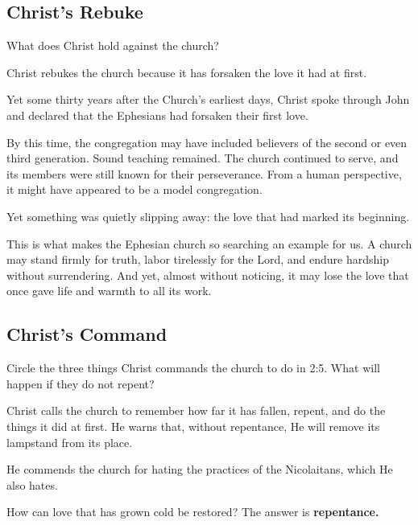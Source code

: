 \subsection{Christ's Rebuke}

\begin{ScriptureBox2}{What does Christ hold against the church?}
\item[2:4] Christ rebukes the church because it has forsaken the love it had at first.
\end{ScriptureBox2}

Yet some thirty years after the Church's earliest days, Christ spoke through John and declared that the Ephesians had forsaken their first love.

By this time, the congregation may have included believers of the second or even third generation. Sound teaching remained. The church continued to serve, and its members were still known for their perseverance. From a human perspective, it might have appeared to be a model congregation.

Yet something was quietly slipping away: the love that had marked its beginning.

This is what makes the Ephesian church so searching an example for us. A church may stand firmly for truth, labor tirelessly for the Lord, and endure hardship without surrendering. And yet, almost without noticing, it may lose the love that once gave life and warmth to all its work.

\subsection{Christ's Command}

\begin{ScriptureBox2}{Circle the three things Christ commands the church to do in 2:5. What will happen if they do not repent?}
\item[2:5] Christ calls the church to remember how far it has fallen, repent, and do the things it did at first. He warns that, without repentance, He will remove its lampstand from its place.

\item[2:6] He commends the church for hating the practices of the Nicolaitans, which He also hates.
\end{ScriptureBox2}

How can love that has grown cold be restored? The answer is \textbf{repentance.}

